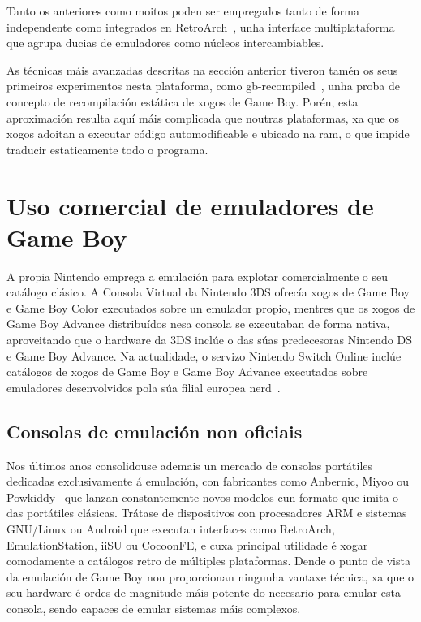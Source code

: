 Tanto os anteriores como moitos poden ser empregados tanto de forma independente como integrados en RetroArch~\cite{retroarch},
unha interface multiplataforma que agrupa ducias de emuladores como núcleos intercambiables.

As técnicas máis avanzadas descritas na sección anterior tiveron tamén
os seus primeiros experimentos nesta plataforma,
como gb-recompiled~\cite{gbrecompiled},
unha proba de concepto de recompilación estática de xogos de Game Boy.
Porén, esta aproximación resulta aquí máis complicada que noutras plataformas,
xa que os xogos adoitan a executar código automodificable e ubicado na \acrshort{ram},
o que impide traducir estaticamente todo o programa.


\section{Uso comercial de emuladores de Game Boy}

A propia Nintendo emprega a emulación para explotar comercialmente o seu catálogo clásico.
A Consola Virtual da Nintendo 3DS ofrecía xogos de Game Boy e Game Boy Color
executados sobre un emulador propio,
mentres que os xogos de Game Boy Advance distribuídos nesa consola
se executaban de forma nativa,
aproveitando que o hardware da 3DS inclúe o das súas predecesoras Nintendo DS e Game Boy Advance.
Na actualidade, o servizo Nintendo Switch Online inclúe catálogos de xogos
de Game Boy e Game Boy Advance executados sobre emuladores desenvolvidos
pola súa filial europea \acrfull{nerd}~\cite{nso}.

\subsection*{Consolas de emulación non oficiais}
\label{subsec:consolas-emulacion}
Nos últimos anos consolidouse ademais un mercado de consolas portátiles
dedicadas exclusivamente á emulación,
con fabricantes como Anbernic, Miyoo ou Powkiddy~\cite{anbernic}
que lanzan constantemente novos modelos cun formato que imita o das portátiles clásicas.
Trátase de dispositivos con procesadores ARM e sistemas GNU/Linux ou Android
que executan interfaces como RetroArch, EmulationStation, iiSU ou CocoonFE,
e cuxa principal utilidade é xogar comodamente a catálogos retro de múltiples plataformas.
Dende o punto de vista da emulación de Game Boy non proporcionan ningunha vantaxe técnica, xa que
o seu hardware é ordes de magnitude máis potente do necesario para emular esta consola,
sendo capaces de emular sistemas máis complexos.

